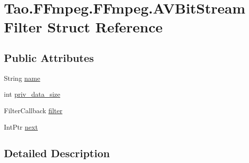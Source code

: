 \hypertarget{struct_tao_1_1_f_fmpeg_1_1_f_fmpeg_1_1_a_v_bit_stream_filter}{
\section{Tao.FFmpeg.FFmpeg.AVBitStreamFilter Struct Reference}
\label{struct_tao_1_1_f_fmpeg_1_1_f_fmpeg_1_1_a_v_bit_stream_filter}
}
\subsection*{Public Attributes}
\begin{DoxyCompactItemize}
\item 
String \hyperlink{struct_tao_1_1_f_fmpeg_1_1_f_fmpeg_1_1_a_v_bit_stream_filter_a8697a6a8c26937c20b133c2a9c9c91c8}{name}
\item 
int \hyperlink{struct_tao_1_1_f_fmpeg_1_1_f_fmpeg_1_1_a_v_bit_stream_filter_add16ef5ddc3a0ceb9a6951938b1eb151}{priv\_\-data\_\-size}
\item 
FilterCallback \hyperlink{struct_tao_1_1_f_fmpeg_1_1_f_fmpeg_1_1_a_v_bit_stream_filter_a2fc5512a328289309cad3e4bd31a777c}{filter}
\item 
IntPtr \hyperlink{struct_tao_1_1_f_fmpeg_1_1_f_fmpeg_1_1_a_v_bit_stream_filter_af1354f61c38a045df497a6674ddadf60}{next}
\end{DoxyCompactItemize}


\subsection{Detailed Description}


